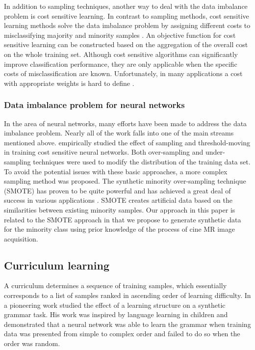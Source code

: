 \documentclass[preprint,12pt,authoryear]{elsarticle}
\begin{document}
In addition to sampling techniques, another way to deal with the data imbalance problem is cost sensitive learning. In contrast to sampling methods, cost sensitive learning methods solve the data imbalance problem by assigning different costs to misclassifying majority and minority samples \citep{Khan2018}. An objective function for cost sensitive learning can be constructed based on the aggregation of the overall cost on the whole training set.
Although cost sensitive algorithms can significantly improve classification performance, they are only applicable when the specific costs of misclassification are known. Unfortunately, in many applications a cost with appropriate weights is hard  to define \citep{Maloof2003}.

\subsubsection{Data imbalance problem for neural networks}

In the area of neural networks, many efforts have been made  to address the data imbalance problem. Nearly all of the work falls into one of the main streams mentioned above.
\cite{Zhou2006} empirically studied the effect of sampling and threshold-moving in training cost sensitive  neural  networks. Both over-sampling  and  under-sampling techniques were used to modify the distribution of the training  data  set. To avoid the potential issues with these basic approaches, a more complex sampling method was proposed. The synthetic minority over-sampling technique (SMOTE) has proven to be quite powerful and has achieved a great deal of success in various applications \citep{Han2005}. SMOTE creates artificial data based on the similarities between existing minority samples.
Our approach in this paper is related to the SMOTE approach in that we propose to generate synthetic data for the minority class using prior knowledge of the process of cine MR image acquisition.
 
\subsection{Curriculum learning}
\label{sec:curriculumintro}

A curriculum determines a sequence of training samples, which essentially corresponds to a list of samples ranked in ascending order of learning difficulty. 
In a pioneering work \cite{Elman1993} studied the effect of a learning structure on a synthetic grammar task. His work was inspired  by  language  learning  in  children  and  demonstrated that a neural network was able  to  learn  the  grammar when training data was presented from simple to complex order and failed to do so when the order was random.\\   
\end{document}
